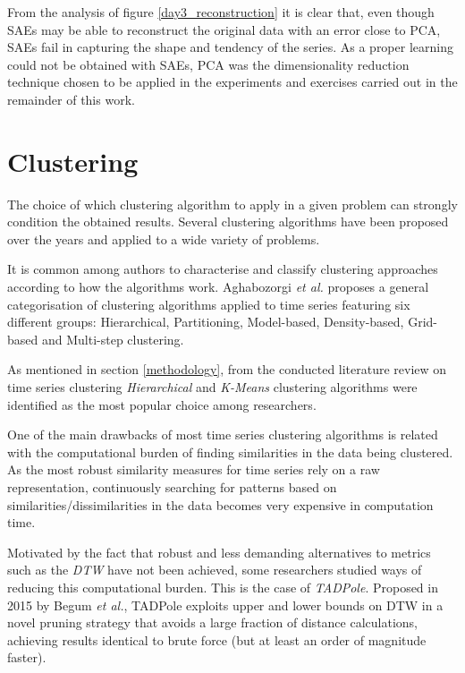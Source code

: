 \documentclass[9pt,journal,compsoc]{IEEEtran}
\begin{document}
From the analysis of figure \ref{day3_reconstruction} it is clear that, even though SAEs may be able to reconstruct the original data with an error close to PCA, SAEs fail in capturing the shape and tendency of the series. As a proper learning could not be obtained with SAEs, PCA was the dimensionality reduction technique chosen to be applied in the experiments and exercises carried out in the remainder of this work.

\section{Clustering}

The choice of which clustering algorithm to apply in a given problem can strongly condition the obtained results. Several clustering algorithms have been proposed over the years and applied to a wide variety of problems.

It is common among authors to characterise and classify clustering approaches according to how the algorithms work. Aghabozorgi \emph{et al.}\cite{aghabozorgi2015time} proposes a general categorisation of clustering algorithms applied to time series featuring six different groups: Hierarchical, Partitioning, Model-based, Density-based, Grid-based and Multi-step clustering.

As mentioned in section \ref{methodology}, from the conducted literature review on time series clustering \emph{Hierarchical} and \emph{K-Means} clustering algorithms were identified as the most popular choice among researchers.

One of the main drawbacks of most time series clustering algorithms is related with the computational burden of finding similarities in the data being clustered. As the most robust similarity measures for time series rely on a raw representation, continuously searching for patterns based on similarities/dissimilarities in the data becomes very expensive in computation time.

Motivated by the fact that robust and less demanding alternatives to metrics such as the \emph{DTW} have not been achieved, some researchers studied ways of reducing this computational burden. This is the case of \emph{TADPole}\cite{begum2015accelerating}. Proposed in 2015 by Begum \emph{et al.}, TADPole exploits upper and lower bounds on DTW in a novel pruning strategy that avoids a large fraction of distance calculations, achieving results identical to brute force (but at least an order of magnitude faster).
\end{document}
